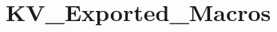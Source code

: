 \hypertarget{group___k_v___exported___macros}{}\section{K\+V\+\_\+\+Exported\+\_\+\+Macros}
\label{group___k_v___exported___macros}

